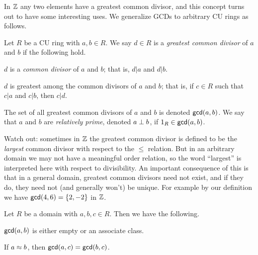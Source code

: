 In \(\mathbb{Z}\) any two elements have a greatest common divisor, and this concept turns out to have some interesting uses.
We generalize GCDs to arbitrary CU rings as follows.

\begin{dfn}
Let \(R\) be a CU ring with \(a,b \in R\).
We say \(d \in R\) is a \emph{greatest common divisor} of \(a\) and \(b\) if the following hold.
\begin{proplist}
\item \(d\) is a \emph{common divisor} of \(a\) and \(b\); that is, \(d|a\) and \(d|b\).
\item \(d\) is greatest among the common divisors of \(a\) and \(b\); that is, if \(c \in R\) such that \(c|a\) and \(c|b\), then \(c|d\).
\end{proplist}
The set of all greatest common divisors of \(a\) and \(b\) is denoted \(\mathsf{gcd}(a, b)\).
We say that \(a\) and \(b\) are \emph{relatively prime}, denoted \(a \perp b\), if \(1_R \in \mathsf{gcd}(a, b)\).
\end{dfn}

Watch out: sometimes in \(\mathbb{Z}\) the greatest common divisor is defined to be the \emph{largest} common divisor with respect to the \(\leq\) relation.
But in an arbitrary domain we may not have a meaningful order relation, so the word ``largest'' is interpreted here with respect to divisibility.
An important consequence of this is that in a general domain, greatest common divisors need not exist, and if they do, they need not (and generally won't) be unique.
For example by our definition we have \(\mathsf{gcd}(4, 6) = \{2, -2\}\) in \(\mathbb{Z}\).

\begin{prop} \label{prop:gcd-assoc}
Let \(R\) be a domain with \(a,b,c \in R\).
Then we have the following.
\begin{proplist*}
\item \label{prop:gcd-assoc:class}\(\mathsf{gcd}(a, b)\) is either empty or an associate class.
\item \label{prop:gcd-assoc:well-defined} If \(a \approx b\), then \(\mathsf{gcd}(a, c) = \mathsf{gcd}(b, c)\).
\end{proplist*}
\end{prop}

